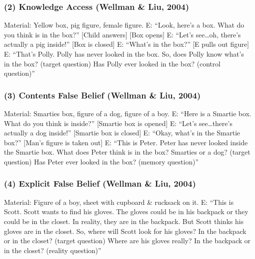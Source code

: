 \documentclass[
  man,mask,floatsintext]{apa7}
\begin{document}
\hypertarget{knowledge-access-wellman2004scaling}{%
\subsubsection{(2) Knowledge Access (Wellman \& Liu, 2004)}\label{knowledge-access-wellman2004scaling}}

Material: Yellow box, pig figure, female figure.
E: ``Look, here's a box. What do you think is in the box?'' {[}Child answers{]} {[}Box opens{]} E: ``Let's see\ldots oh, there's actually a pig inside!'' {[}Box is closed{]} E: ``What's in the box?'' {[}E pulls out figure{]} E: ``That's Polly. Polly has never looked in the box. So, does Polly know what's in the box? (target question) Has Polly ever looked in the box? (control question)''

\hypertarget{contents-false-belief-wellman2004scaling}{%
\subsubsection{(3) Contents False Belief (Wellman \& Liu, 2004)}\label{contents-false-belief-wellman2004scaling}}

Material: Smarties box, figure of a dog, figure of a boy.
E: ``Here is a Smartie box. What do you think is inside?'' {[}Smartie box is opened{]} E: ``Let's see\ldots there's actually a dog inside!'' {[}Smartie box is closed{]} E: ``Okay, what's in the Smartie box?'' {[}Man's figure is taken out{]} E: ``This is Peter. Peter has never looked inside the Smartie box. What does Peter think is in the box? Smarties or a dog? (target question) Has Peter ever looked in the box? (memory question)''

\hypertarget{explicit-false-belief-wellman2004scaling}{%
\subsubsection{(4) Explicit False Belief (Wellman \& Liu, 2004)}\label{explicit-false-belief-wellman2004scaling}}

Material: Figure of a boy, sheet with cupboard \& rucksack on it.
E: ``This is Scott. Scott wants to find his gloves. The gloves could be in his backpack or they could be in the closet. In reality, they are in the backpack. But Scott thinks his gloves are in the closet. So, where will Scott look for his gloves? In the backpack or in the closet? (target question) Where are his gloves really? In the backpack or in the closet? (reality question)''
\end{document}
